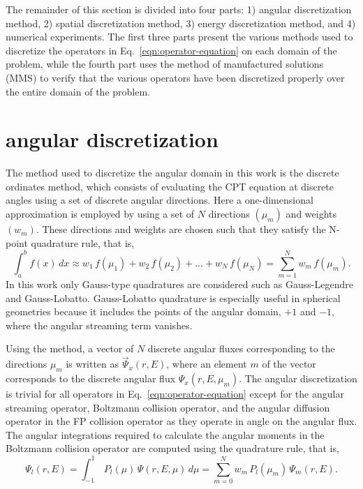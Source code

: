 \documentclass[../main.tex]{subfiles}
\begin{document}
The remainder of this section is divided into four parts: 1) \Sn angular discretization method, 2) \dG spatial discretization method, 3) \dG energy discretization method, and 4) numerical experiments. The first three parts present the various methods used to discretize the operators in Eq.~\eqref{eqn:operator-equation} on each domain of the problem, while the fourth part uses the method of manufactured solutions (MMS) to verify that the various operators have been discretized properly over the entire domain of the problem.

\section{\Sn angular discretization}
The method used to discretize the angular domain in this work is the discrete ordinates method, which consists of evaluating the CPT equation at discrete angles using a set of discrete angular directions. Here a one-dimensional \Sn approximation is employed by using a set of $N$ directions $(\mu_m)$ and weights $(w_m)$. These directions and weights are chosen such that they satisfy the N-point quadrature rule, that is,
\begin{equation}
    \int_{a}^b f(x) \, dx \approx w_1 \, f(\mu_1) + w_2 \, f(\mu_2) + \ldots + w_N \, f(\mu_N) = \sum_{m=1}^N w_{m} \, f(\mu_m).
\end{equation}
In this work only Gauss-type quadratures are considered such as Gauss-Legendre and Gauss-Lobatto. Gauss-Lobatto quadrature is especially useful in spherical geometries because it includes the points of the angular domain, $+1$ and $-1$, where the angular streaming term vanishes. 

Using the \Sn method, a vector of $N$ discrete angular fluxes corresponding to the directions $\mu_m$ is written as $\vec{\Psi}_x(r,E)$, where an element $m$ of the vector corresponds to the discrete angular flux $\Psi_x(r,E,\mu_m)$. The angular discretization is trivial for all operators in Eq.~\eqref{eqn:operator-equation} except for the angular streaming operator, Boltzmann collision operator, and the angular diffusion operator in the FP collision operator as they operate in angle on the angular flux. The angular integrations required to calculate the angular moments in the Boltzmann collision operator are computed using the quadrature rule, that is,
\begin{equation}
    \Psi_l(r,E) = \int_{-1}^1 \, P_l(\mu) \, \Psi(r,E,\mu) \, d\mu = \sum_{m=0}^N w_m \, P_l(\mu_m) \, \Psi_m(r,E).
\end{equation} 
\end{document}
